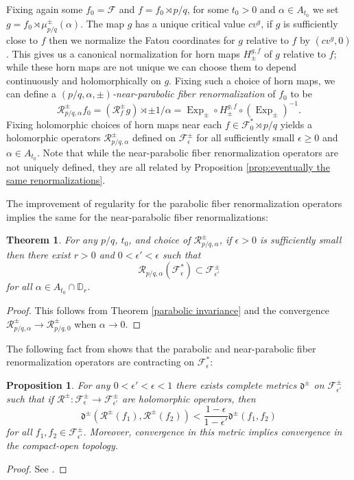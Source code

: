 \documentclass[12pt,letterpaper]{amsart}
\numberwithin{equation}{section}
\newtheorem{theorem}[equation]{Theorem}
\newtheorem{proposition}[equation]{Proposition}
\theoremstyle{remark}
\theoremstyle{definition}
\newcommand{\D}{\mathbb D}
\newcommand{\FF}{\mathcal F}
\newcommand{\RR}{\mathcal R}
\DeclareMathOperator{\Exp}{Exp}
\begin{document}
	
	
	Fixing again some $f_0= \FF$ and $f = f_0\rtimes p/q$, 
	for some $t_0>0$ and $\alpha\in A_{t_0}$ we set $g = f_0\rtimes \mu_{p/q}^\pm(\alpha)$. 
	The map $g$ has a unique critical value $cv^g$, if $g$ is sufficiently close to $f$ then we normalize the Fatou coordinates for $g$ relative to $f$ by $(cv^g, 0)$. 
	This gives us a canonical normalization for horn maps $H_\pm^{g, f}$ of $g$ relative to $f$; while these horn maps are not unique we can choose them to depend continuously and holomorphically on $g$.
	Fixing such a choice of horn maps, we can define a \textit{$(p/q, \alpha, \pm)$-near-parabolic fiber renormalization} of $f_0$ to be 
	$$\RR_{p/q, \alpha}^\pm f_0 = (\RR_f^\pm g)\rtimes \pm1/\alpha = \Exp_\pm\circ H_\pm^{g, f}\circ (\Exp_\pm)^{-1}.$$
	Fixing holomorphic choices of horn maps near each $f\in \FF_0^*\rtimes p/q$ yields a holomorphic operators $\RR_{p/q, \alpha}^\pm$ defined on $\FF_\epsilon^\pm$ for all sufficiently small $\epsilon\geq 0$ and $\alpha\in A_{t_0}$.
	Note that while  the near-parabolic fiber renormalization operators are not uniquely defined, they are all related by Proposition \ref{prop:eventually the same renormalizations}.
	
	
	The improvement of regularity for the parabolic fiber renormalization operators implies the same for the near-parabolic fiber renormalizations:
   	 \begin{theorem}\label{near-parabolic invariance}
   	 	For any $p/q$, $t_0$, and choice of $\mathcal{R}_{p/q, \alpha}^\pm$, if $\epsilon>0$ is sufficiently small then there exist $r>0$ and $0 < \epsilon' < \epsilon$ such that 
   	 	$$\mathcal{R}_{p/q, \alpha}(\mathcal{F}_\epsilon^*)\subset \mathcal{F}_{\epsilon'}^\pm$$
   	 	for all $\alpha \in A_{t_0}\cap \D_r$.
   	 \end{theorem} 
   	 
   	 \begin{proof}
   	 	This follows from Theorem \ref{parabolic invariance} and the convergence $\RR_{p/q, \alpha}^\pm\to \RR_{p/q, 0}^\pm$ when $\alpha\to 0$.
   	 \end{proof}
   	 
	The following fact from \cite{shishikura} shows that the parabolic and near-parabolic fiber renormalization operators are contracting on $\mathcal{F}_\epsilon^*$:
	\begin{proposition}\label{contraction}
		For any $0 < \epsilon' < \epsilon<1$ there exists complete metrics $\mathfrak{d}^\pm$ on $\mathcal{F}_{\epsilon'}^\pm$ such that if $\mathcal{R}^\pm: \mathcal{F}_\epsilon^\pm\to \mathcal{F}_{\epsilon'}^\pm$ are holomorphic operators, then
		$$\mathfrak{d}^\pm(\mathcal{R}^\pm(f_1), \mathcal{R}^\pm(f_2))< \frac{1-\epsilon}{1-\epsilon'}\mathfrak{d}^\pm(f_1, f_2)$$
		for all $f_1, f_2\in \mathcal{F}_{\epsilon'}^\pm$.
		Moreover, convergence in this metric implies convergence in the compact-open topology.
	\end{proposition}
	\begin{proof}
		See \cite[Main Theorem 2]{shishikura}.
	\end{proof}
	
\end{document}
